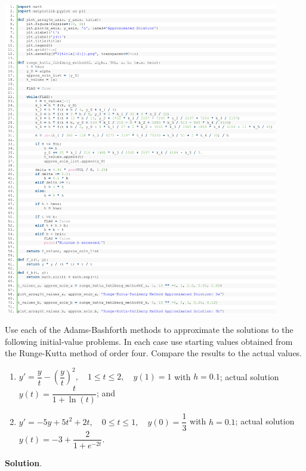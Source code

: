 \documentclass[11pt]{article}
\theoremstyle{break}
\numberwithin{equation}{theorem}
\begin{document}
\begin{center}
    \includegraphics[width=0.9\textwidth]{P9.png}
\end{center}


\newpage
\begin{problem}\label{problem 10} %
    Use each of the Adams-Bashforth methods to approximate the solutions to the following initial-value problems. In each case use starting values obtained from the Runge-Kutta method of order four. Compare the results to the actual values.
    \begin{enumerate}
        \item $y'=\dfrac{y}{t}-\left(\dfrac{y}{t}\right)^2, \quad1\leq t\leq 2, \quad y(1)=1$ with $h=0.1$; actual solution $y(t)=\dfrac{t}{1+\ln(t)}$; and
        \item $y'=-5y+5t^2+2t, \quad 0\leq t\leq 1, \quad y(0)=\dfrac{1}{3}$ with $h=0.1$; actual solution $y(t)=-3+\dfrac{2}{1+e^{-2t}}$.
    \end{enumerate}
\end{problem}
\textbf{Solution}. 
\end{document}
